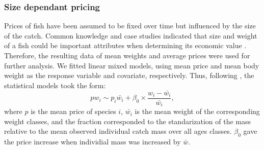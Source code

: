 \documentclass[12pt,oneline,a4paper,numbib]{ouparticle}
\numberwithin{equation}{subsection} %
\begin{document}
\subsubsection{Size dependant pricing}
\label{sec2.2.1}
Prices of fish have been assumed to be fixed over time but influenced by the size of the catch. Common knowledge and case studies indicated that size and weight of a fish could be important attributes when determining its economic value \cite{Zimmermann2011, Zimmermann2013}. Therefore, the resulting data of mean weights and average prices were used for further analysis. We fitted linear mixed models, using mean price and mean body weight as the response variable and covariate, respectively. Thus, following \cite{Zimmermann2011}, the statistical models took the form:  
\begin{equation}
 pw_{i} \sim p_i \bar{w_i} + \beta_0 \times \frac{w_i-\bar{w_i}}{\bar{w_i}},
\end{equation}
where $p$ is the mean price of species $i$, $\bar{w_i}$ is the mean weight of the corresponding weight classes, and the fraction corresponded to the standarization of the mass relative to the mean observed individual catch mass over all ages classes. $\beta_0$ gave the price increase when individial mass was increased by $\bar{w}$.
\begin{table}[!h]
\centering
\caption{Size dependant pricing.}
\label{t:pricing}
\end{table}
\end{document}
